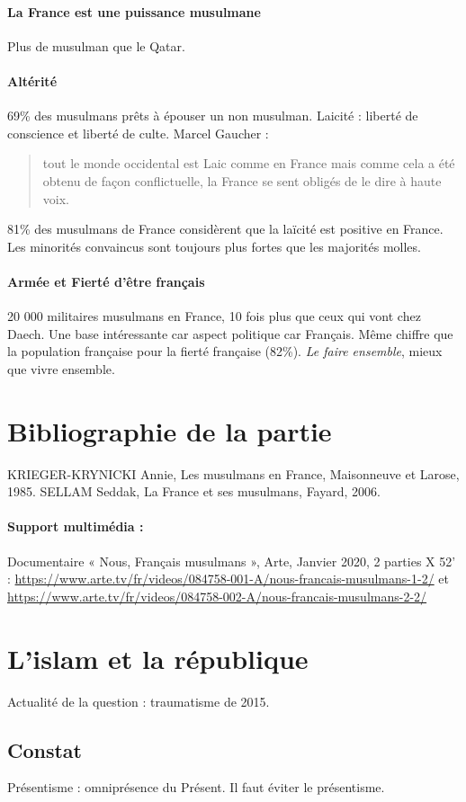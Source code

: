 \paragraph{La France est une puissance musulmane} Plus de musulman que le Qatar. 

\paragraph{Altérité}

69\% des musulmans prêts à épouser un non musulman.
Laicité : liberté de conscience et liberté de culte. 
Marcel Gaucher : 
\begin{quote}
    tout le monde occidental est Laic comme en France mais comme cela a été obtenu de façon conflictuelle, la France se sent obligés de le dire à haute voix. 
\end{quote}
81\% des musulmans de France considèrent que la laïcité est positive en France. Les minorités convaincus sont toujours plus fortes que les majorités molles. 

\paragraph{Armée et Fierté d'être français}
20 000 militaires musulmans en France, 10 fois plus que ceux qui vont chez Daech. Une base intéressante car aspect politique car Français. Même chiffre que la population française pour la fierté française (82\%).
\emph{Le faire ensemble}, mieux que vivre ensemble.



\section{Bibliographie de la partie}
\cite{Arkoun:histoire}
KRIEGER-KRYNICKI Annie, Les musulmans en France, Maisonneuve et Larose,
1985.
SELLAM Seddak, La France et ses musulmans, Fayard, 2006.
\paragraph{Support multimédia :}
Documentaire « Nous, Français musulmans », Arte, Janvier 2020, 2 parties X 52’ :
\url{https://www.arte.tv/fr/videos/084758-001-A/nous-francais-musulmans-1-2/} et
\url{https://www.arte.tv/fr/videos/084758-002-A/nous-francais-musulmans-2-2/}


\section{L'islam et la république}

Actualité de la question : traumatisme de 2015.

\subsection{Constat}

Présentisme : omniprésence du Présent. Il faut éviter le présentisme.

